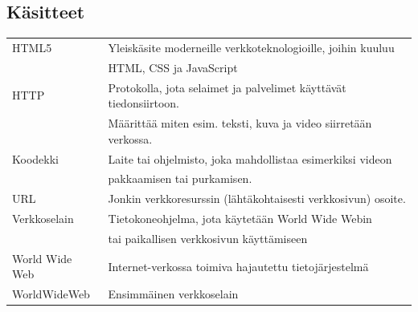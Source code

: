\documentclass[finnish, 12pt, a4paper, elec, utf8, a-1b, online]{aaltothesis}
\date{XX.XX.2022}
\begin{document}
\makecoverpage{}

\makecopyrightpage{}

\begin{abstractpage}[finnish]
  \abstracttext{}
\end{abstractpage}


\newpage

\thesistableofcontents


\subsection*{Käsitteet}
\begin{tabular}{ll}
  HTML5           & Yleiskäsite moderneille verkkoteknologioille, joihin kuuluu \\
                  & HTML, CSS ja JavaScript \\
  HTTP            & Protokolla, jota selaimet ja palvelimet käyttävät tiedonsiirtoon. \\
                  & Määrittää miten esim. teksti, kuva ja video siirretään verkossa. \\
  Koodekki        & Laite tai ohjelmisto, joka mahdollistaa esimerkiksi videon \\
                  & pakkaamisen tai purkamisen. \\
  URL             & Jonkin verkkoresurssin (lähtäkohtaisesti verkkosivun) osoite.\\
  Verkkoselain    & Tietokoneohjelma, jota käytetään World Wide Webin \\
                  & tai paikallisen verkkosivun käyttämiseen \\
  World Wide Web  & Internet-verkossa toimiva hajautettu tietojärjestelmä \\
  WorldWideWeb    & Ensimmäinen verkkoselain
\end{tabular}
\end{document}
